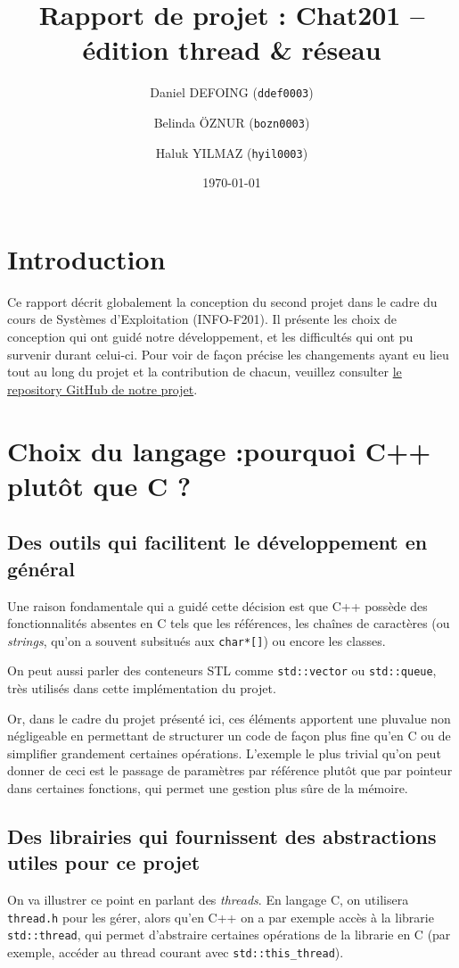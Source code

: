 \documentclass{article}
\title{Rapport de projet : Chat201 – édition thread \& réseau}
\author{Daniel DEFOING (\texttt{ddef0003}) \and 
        Belinda ÖZNUR (\texttt{bozn0003}) \and
        Haluk YILMAZ (\texttt{hyil0003})}
\date{\today}
\begin{document}

\maketitle
\tableofcontents
\newpage

\section{Introduction}
Ce rapport décrit globalement la conception du second projet dans le cadre du cours de Systèmes d'Exploitation
(INFO-F201). Il présente les choix de conception qui ont guidé notre développement, et les difficultés qui ont pu survenir durant celui-ci. Pour voir de façon précise les changements ayant eu lieu tout au long du projet et la contribution de chacun, veuillez consulter \hyperref[https://github.com/Daniel-Dfg/OS_Projet_2]{le repository GitHub de notre projet}.

\section{Choix du langage :pourquoi C++ plutôt que C ?}

\subsection*{Des outils qui facilitent le développement en général}
Une raison fondamentale qui a guidé cette décision est que C++ possède des fonctionnalités absentes en C tels que les références, les chaînes de caractères (ou \textit{strings}, qu'on a souvent subsitués aux \texttt{char*[]}) ou encore les classes. 

On peut aussi parler des conteneurs STL comme \texttt{std::vector} ou \texttt{std::queue}, très utilisés dans cette implémentation du projet.

Or, dans le cadre du projet présenté ici, ces éléments apportent une pluvalue non négligeable en permettant de structurer un code de façon plus fine qu'en C ou de simplifier grandement certaines opérations. L'exemple le plus trivial qu'on peut donner de ceci est le passage de paramètres par référence plutôt que par pointeur dans certaines fonctions, qui permet une gestion plus sûre de la mémoire.

\subsection*{Des librairies qui fournissent des abstractions utiles pour ce projet}
On va illustrer ce point en parlant des \textit{threads}. En langage C, on utilisera \texttt{thread.h} pour les gérer, alors qu'en C++ on a par exemple accès à la librarie \texttt{std::thread}, qui permet d'abstraire certaines opérations de la librarie en C (par exemple, accéder au thread courant avec \texttt{std::this\_thread}).
\end{document}
